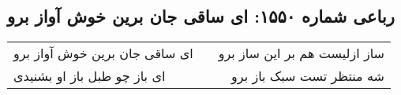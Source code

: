 \begin{center}
\section*{رباعی شماره ۱۵۵۰: ای ساقی جان برین خوش آواز برو}
\label{sec:1550}
\begin{longtable}{l p{0.5cm} r}
ای ساقی جان برین خوش آواز برو
&&
ساز ازلیست هم بر این ساز برو
\\
ای باز چو طبل باز او بشنیدی
&&
شه منتظر تست سبک باز برو
\\
\end{longtable}
\end{center}
